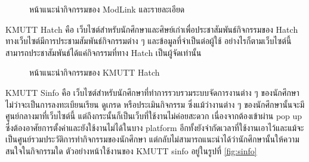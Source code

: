 \documentclass[14pt,oneside,openright,a4paper]{cpe-thai-project}
\begin{document}
  \begin{figure}[!h]\centering
    \setlength{\fboxrule}{0.5mm} %
    \setlength{\fboxsep}{0.5cm}
    \caption{หน้าแนะนำกิจกรรมของ ModLink และรายละเอียด}\label{fig:modlink}
    \end{figure}

\newpage

KMUTT Hatch คือ เว็บไซต์สำหรับนักศึกษาและศิษย์เก่าเพื่อประชาสัมพันธ์กิจกรรมของ Hatch ทางเว็บไซต์มีการประชามสัมพันธ์กิจกรรมต่าง ๆ และข้อมูลที่จำเป็นต่อผู้ใช้ อย่างไรก็ตามเว็บไซต์นี้สามารถประชาสัมพันธ์ได้แค่กิจกรรมที่ทาง Hatch เป็นผู้จัดเท่านั้น

  \begin{figure}[!h]\centering
    \setlength{\fboxrule}{0.5mm} %
    \setlength{\fboxsep}{0.5cm}
    \caption{หน้าแนะนำกิจกรรมของ KMUTT Hatch}\label{fig:hatch}
    \end{figure}



KMUTT Sinfo คือ เว็บไซต์สำหรับนักศึกษาที่ทำการรวบรวมระบบจัดการงานต่าง ๆ ของนักศึกษาไม่ว่าจะเป็นการลงทะเบียนเรียน ดูเกรด หรือประเมินกิจกรรม ซึ่งแม้ว่างานต่าง ๆ ของนักศึกษานั้นจะมีศูนย์กลางมาที่เว็บไซต์นี้ แต่ถึงกระนั้นก็เป็นเว็บที่ใช้งานไม่ค่อยสะดวก เนื่องจากต้องเข้าผ่าน pop up ซึ่งต้องอาศัยการตั้งค่าและยังใช้งานไม่ได้ในบาง platform อีกทั้งยังจำกัดเวลาที่ใช้งานเอาไว้และแม้จะเป็นศูนย์รวมประวัติการทำกิจกรรมของนักศึกษา แต่กลับไม่สามารถแนะนำได้ว่านักศึกษานั้นให้ความสนใจในกิจกรรมใด ตัวอย่างหน้าใช้งานของ KMUTT sinfo อยู่ในรูปที่ \ref{fig:sinfo}
\end{document}
